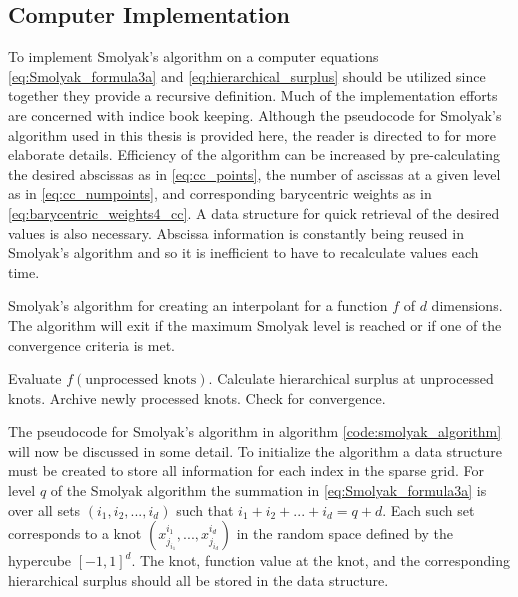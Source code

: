 \subsection{Computer Implementation} \label{subsec:smolyak_implementation}

To implement Smolyak's algorithm on a computer equations \ref{eq:Smolyak_formula3a} and \ref{eq:hierarchical_surplus} should be utilized since together they provide a recursive definition. Much of the implementation efforts are concerned with indice book keeping. Although the pseudocode for Smolyak's algorithm used in this thesis is provided here, the reader is directed to \cite{Klimke_Wohlmuth} for more elaborate details. Efficiency of the algorithm can be increased by pre-calculating the desired abscissas as in \ref{eq:cc_points}, the number of ascissas at a given level as in \ref{eq:cc_numpoints}, and corresponding barycentric weights as in \ref{eq:barycentric_weights4_cc}. A data structure for quick retrieval of the desired values is also necessary. Abscissa information is constantly being reused in Smolyak's algorithm and so it is inefficient to have to recalculate values each time.   
\begin{algorithm}
\caption{\label{code:smolyak_algorithm} Smolyak's algorithm for creating an interpolant for a function $f$ of $d$ dimensions. The algorithm will exit if the maximum Smolyak level is reached or if one of the convergence criteria is met.}  
\begin{algorithmic}[1]
      \EndFor
      \State Evaluate $f(\text{unprocessed knots})$.
      \State Calculate hierarchical surplus at unprocessed knots. 
      \State Archive newly processed knots.
   \EndFor
   \State Check for convergence.
\EndFor 
\end{algorithmic}
\end{algorithm}

The pseudocode for Smolyak's algorithm in algorithm \ref{code:smolyak_algorithm} will now be discussed in some detail. To initialize the algorithm a data structure must be created to store all information for each index in the sparse grid. For level $q$ of the Smolyak algorithm the summation in \ref{eq:Smolyak_formula3a} is over all sets $(i_1,i_2,...,i_d)$ such that $i_1 + i_2 + ... + i_d = q+d$. Each such set corresponds to a knot $(x^{i_1}_{j_{i_1}}, ..., x^{i_d}_{j_{i_d}})$ in the random space defined by the hypercube $\left[-1,1\right]^d$. The knot, function value at the knot, and the corresponding hierarchical surplus should all be stored in the data structure. 

